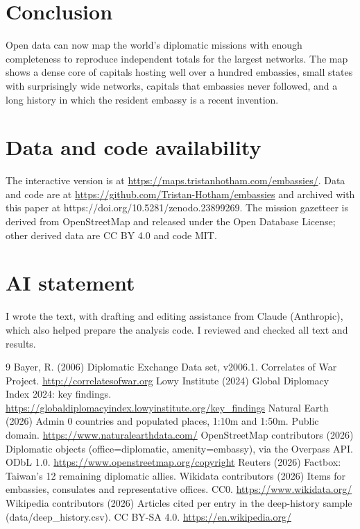 \documentclass[11pt,a4paper]{article}
\begin{document}
\section{Conclusion}
Open data can now map the world's diplomatic missions with enough completeness to reproduce independent totals for the largest networks. The map shows a dense core of capitals hosting well over a hundred embassies, small states with surprisingly wide networks, capitals that embassies never followed, and a long history in which the resident embassy is a recent invention.

\section*{Data and code availability}
The interactive version is at \url{https://maps.tristanhotham.com/embassies/}. Data and code are at \url{https://github.com/Tristan-Hotham/embassies} and archived with this paper at https://doi.org/10.5281/zenodo.23899269. The mission gazetteer is derived from OpenStreetMap and released under the Open Database License; other derived data are CC BY 4.0 and code MIT.

\section*{AI statement}
I wrote the text, with drafting and editing assistance from Claude (Anthropic), which also helped prepare the analysis code. I reviewed and checked all text and results.

\begin{thebibliography}{9}
 Bayer, R. (2006) Diplomatic Exchange Data set, v2006.1. Correlates of War Project. \url{http://correlatesofwar.org}
 Lowy Institute (2024) Global Diplomacy Index 2024: key findings. \url{https://globaldiplomacyindex.lowyinstitute.org/key_findings}
 Natural Earth (2026) Admin 0 countries and populated places, 1:10m and 1:50m. Public domain. \url{https://www.naturalearthdata.com/}
 OpenStreetMap contributors (2026) Diplomatic objects (office=diplomatic, amenity=embassy), via the Overpass API. ODbL 1.0. \url{https://www.openstreetmap.org/copyright}
 Reuters (2026) Factbox: Taiwan's 12 remaining diplomatic allies.
 Wikidata contributors (2026) Items for embassies, consulates and representative offices. CC0. \url{https://www.wikidata.org/}
 Wikipedia contributors (2026) Articles cited per entry in the deep-history sample (data/deep\_history.csv). CC BY-SA 4.0. \url{https://en.wikipedia.org/}
\end{thebibliography}
\end{document}
